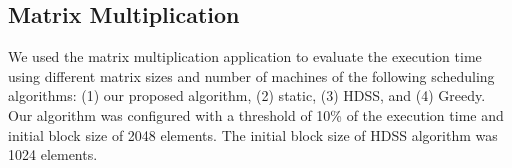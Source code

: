 \documentclass[journal]{IEEEtran}
\begin{document}




\subsection{Matrix Multiplication}


We used the matrix multiplication application to evaluate the execution time
using different matrix sizes and number of machines of the following scheduling
algorithms: (1) our proposed algorithm, (2) static, (3) HDSS, and (4) Greedy. Our algorithm was configured with a threshold of 10\% of the execution time and initial block size of 2048 elements. The initial block size of HDSS algorithm was 1024 elements.
\end{document}
